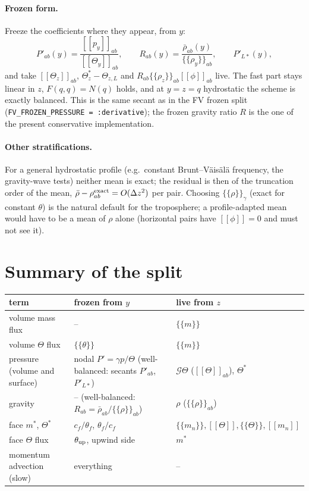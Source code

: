 \documentclass[11pt,a4paper]{article}
\newcommand{\avg}[1]{\{\!\{#1\}\!\}}
\newcommand{\jump}[1]{[\![#1]\!]}
\newcommand{\code}[1]{\texttt{#1}}
\begin{document}
\paragraph{Frozen form.} Freeze the coefficients where they appear, from $y$:
\[
P'_{ab}(y)=\frac{\jump{p_y}_{ab}}{\jump{\Theta_y}_{ab}},\qquad
R_{ab}(y)=\frac{\bar\rho_{ab}(y)}{\avg{\rho_y}_{ab}},\qquad P'_{L*}(y),
\]
and take $\jump{\Theta_z}_{ab}$, $\Theta^*_z-\Theta_{z,L}$ and $R_{ab}\avg{\rho_z}_{ab}\jump\phi_{ab}$ live. The fast part stays
linear in $z$, $F(q,q)=N(q)$ holds, and at $y=z=q$ hydrostatic the scheme is exactly balanced. This is the
same secant as in the FV frozen split (\code{FV\_FROZEN\_PRESSURE = :derivative}); the frozen gravity ratio $R$
is the one of the present conservative implementation.

\paragraph{Other stratifications.} For a general hydrostatic profile (e.g.\ constant Brunt--V\"ais\"al\"a
frequency, the gravity-wave tests) neither mean is exact; the residual is then of the truncation
order of the mean, $\bar\rho-\rho^{\rm exact}_{ab}=O(\Delta z^2)$ per pair. Choosing $\avg\rho_\gamma$ (exact for
constant $\theta$) is the natural default for the troposphere; a profile-adapted mean would have to be a
mean of $\rho$ alone (horizontal pairs have $\jump\phi=0$ and must not see it).

\section{Summary of the split}
\begin{center}
\footnotesize
\begin{tabular}{lll}
\toprule
term & frozen from $y$ & live from $z$\\
\midrule
volume mass flux & -- & $\avg{m}$\\
volume $\Theta$ flux & $\avg{\theta}$ & $\avg{m}$\\
pressure (volume and surface) & nodal $P'=\gamma p/\Theta$ (well-balanced: secants $P'_{ab}$, $P'_{L*}$) & $\mathcal G\Theta$ ($\jump\Theta_{ab}$), $\Theta^*$\\
gravity & -- (well-balanced: $R_{ab}=\bar\rho_{ab}/\avg{\rho}_{ab}$) & $\rho$ ($\avg\rho_{ab}$)\\
face $m^*$, $\Theta^*$ & $c_f/\theta_f$, $\theta_f/c_f$ & $\avg{m_n},\jump\Theta,\avg\Theta,\jump{m_n}$\\
face $\Theta$ flux & $\theta_{\rm up}$, upwind side & $m^*$\\
\midrule
momentum advection (slow) & everything & --\\
\bottomrule
\end{tabular}
\end{center}
\end{document}
